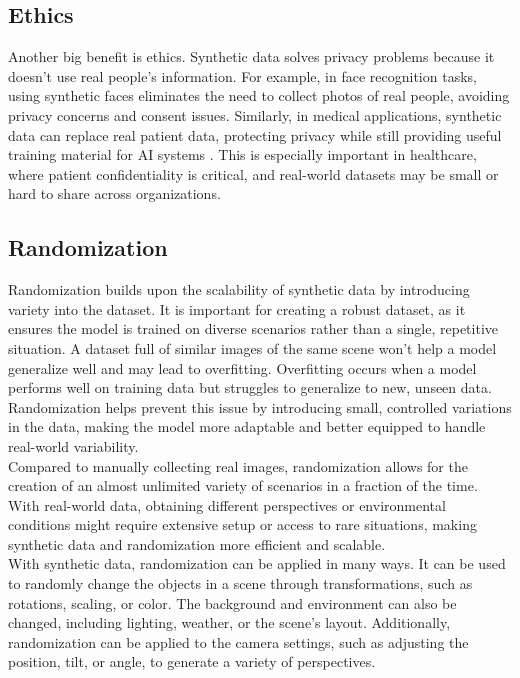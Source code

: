 \subsection{Ethics}
Another big benefit is ethics. Synthetic data solves privacy problems because it doesn’t use real people’s information. For example, in face recognition tasks, using synthetic faces eliminates the need to collect photos of real people, avoiding privacy concerns and consent issues. Similarly, in medical applications, synthetic data can replace real patient data, protecting privacy while still providing useful training material for AI systems . This is especially important in healthcare, where patient confidentiality is critical, and real-world datasets may be small or hard to share across organizations. \cite{jimaging8110310}

\subsection{Randomization}
Randomization builds upon the scalability of synthetic data by introducing variety into the dataset. It is important for creating a robust dataset, as it ensures the model is trained on diverse scenarios rather than a single, repetitive situation.\cite{borkman2021unityperceptiongeneratesynthetic} A dataset full of similar images of the same scene won’t help a model generalize well and may lead to overfitting. Overfitting occurs when a model performs well on training data but struggles to generalize to new, unseen data. \cite{Ying_2019} Randomization helps prevent this issue by introducing small, controlled variations in the data, making the model more adaptable and better equipped to handle real-world variability.\\

\noindent Compared to manually collecting real images, randomization allows for the creation of an almost unlimited variety of scenarios in a fraction of the time. With real-world data, obtaining different perspectives or environmental conditions might require extensive setup or access to rare situations, making synthetic data and randomization more efficient and scalable. \cite{borkman2021unityperceptiongeneratesynthetic} \\

\noindent With synthetic data, randomization can be applied in many ways. It can be used to randomly change the objects in a scene through transformations, such as rotations, scaling, or color. The background and environment can also be changed, including lighting, weather, or the scene’s layout. Additionally, randomization can be applied to the camera settings, such as adjusting the position, tilt, or angle, to generate a variety of perspectives. \cite{borkman2021unityperceptiongeneratesynthetic}\\

